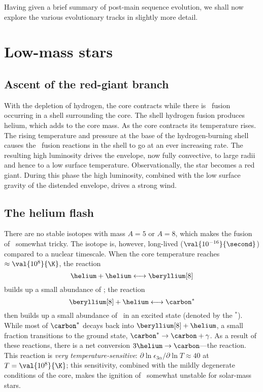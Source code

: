 Having given a brief summary of post-main sequence evolution, we shall now explore the various evolutionary tracks in slightly more detail.

\section{Low-mass stars}

\subsection{Ascent of the red-giant branch}

With the depletion of hydrogen, the core contracts while there is \hydrogen\ fusion occurring in a shell surrounding the core. The shell hydrogen fusion produces helium, which adds to the core mass. As the core contracts its temperature rises. The rising temperature and pressure at the base of the hydrogen-burning shell causes the \hydrogen\ fusion reactions in the shell to go at an ever increasing rate. The resulting high luminosity drives the envelope, now fully convective, to large radii and hence to a low surface temperature. Observationally, the star becomes a red giant.  During this phase the high luminosity, combined with the low surface gravity of the distended envelope, drives a strong wind.

\subsection{The helium flash}
There are no stable isotopes with mass $A=5$ or $A=8$, which makes the fusion of \helium\ somewhat tricky.  The isotope \beryllium[8] is, however, long-lived ($\val{10^{-16}}{\second}$) compared to a nuclear timescale.
When the core temperature reaches $\approx\val{10^{8}}{\K}$, the reaction
\[ \helium + \helium \longleftrightarrow\beryllium[8] \]
builds up a small abundance of \beryllium[8]; the reaction
\[ \beryllium[8] + \helium \longleftrightarrow \carbon^{*} \]
then builds up a small abundance of \carbon\ in an excited state (denoted by the $^{*}$).  While most of $\carbon^{*}$ decays back into $\beryllium[8]+\helium$, a small fraction transitions to the ground state, $\carbon^{*}\to\carbon+\gamma$. As a result of these reactions, there is a net conversion $3\helium\to\carbon$---the  reaction.  This reaction is \emph{very temperature-sensitive}: $\partial\ln\epsilon_{3\alpha}/\partial\ln T \approx 40$ at $T = \val{10^{8}}{\K}$; this sensitivity, combined with the mildly degenerate conditions of the core, makes the ignition of \helium\ somewhat unstable for solar-mass stars.

